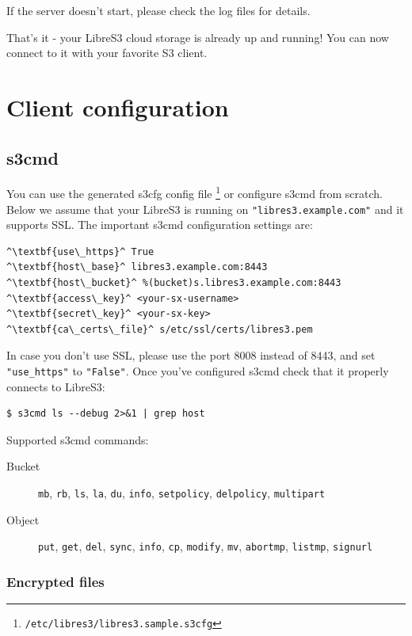 If the server doesn't start, please check the log files for details.

That's it - your LibreS3 cloud storage is already up and running!
You can now connect to it with your favorite S3 client.

\chapter{Client configuration}
\section*{s3cmd}

You can use the generated s3cfg config file
\footnote{\verb|/etc/libres3/libres3.sample.s3cfg|}
 or configure s3cmd from scratch.
Below we assume that your LibreS3
is running on \verb|"libres3.example.com"| and it supports SSL.
The important s3cmd configuration settings are:

\begin{lstlisting}
^\textbf{use\_https}^ True
^\textbf{host\_base}^ libres3.example.com:8443
^\textbf{host\_bucket}^ %(bucket)s.libres3.example.com:8443
^\textbf{access\_key}^ <your-sx-username>
^\textbf{secret\_key}^ <your-sx-key>
^\textbf{ca\_certs\_file}^ s/etc/ssl/certs/libres3.pem
\end{lstlisting}


In case you don't use SSL, please use the port 8008 instead of 8443, and set
\verb|"use_https"| to \verb|"False"|. Once you've configured s3cmd check
that it properly connects to LibreS3:

\begin{lstlisting}
$ s3cmd ls --debug 2>&1 | grep host
\end{lstlisting}


Supported s3cmd commands:
\begin{description}
    \item[Bucket] \verb|mb|, \verb|rb|, \verb|ls|, \verb|la|, \verb|du|, \verb|info|,
		\verb|setpolicy|, \verb|delpolicy|,
		\verb|multipart|
    \item[Object] \verb|put|, \verb|get|, \verb|del|, \verb|sync|, \verb|info|,
        \verb|cp|, \verb|modify|, \verb|mv|, \verb|abortmp|, \verb|listmp|,
        \verb|signurl|
        
\end{description}

\subsection*{Encrypted files}


